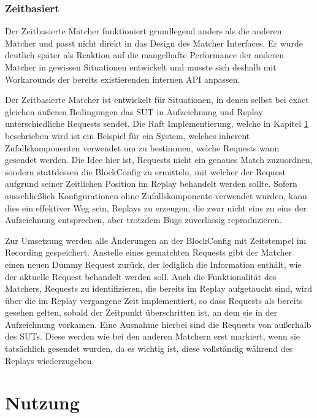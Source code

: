 \documentclass[12pt,a4paper]{report}
\begin{document}
\subsubsection{Zeitbasiert}
Der Zeitbasierte Matcher funktioniert grundlegend anders als die anderen Matcher und passt nicht direkt in das Design des Matcher
Interfaces. Er wurde deutlich später als Reaktion auf die mangelhafte Performance der anderen Matcher in gewissen Situationen
entwickelt und musste sich deshalb mit Workarounds der bereits existierenden internen API anpassen.

Der Zeitbasierte Matcher ist entwickelt für Situationen, in denen selbst bei exact gleichen äußeren Bedingungen das SUT in
Aufzeichnung und Replay unterschiedliche Requests sendet. Die Raft Implementierung, welche in Kapitel \ref{} beschrieben wird ist ein
Beispiel für ein System, welches inherent Zufallskomponenten verwendet um zu bestimmen, welche Requests wann gesendet werden.
Die Idee hier ist, Requests nicht ein genaues Match zuzuordnen, sondern stattdessen die BlockConfig zu ermitteln, mit welcher der
Request aufgrund seiner Zeitlichen Position im Replay behandelt werden sollte. Sofern ausschließlich Konfigurationen ohne
Zufallskomponente verwendet wurden, kann dies ein effektiver Weg sein, Replays zu erzeugen, die zwar nicht eins zu eins der
Aufzeichnung entsprechen, aber trotzdem Bugs zuverlässig reproduzieren.

Zur Umsetzung werden alle Änderungen an der BlockConfig mit Zeitstempel im Recording gespeichert. Anstelle eines gematchten
Requests gibt der Matcher einen neuen Dummy Request zurück, der lediglich die Information enthält, wie der aktuelle Request
behandelt werden soll. Auch die Funktionalität des Matchers, Requests zu identifizieren, die bereits im Replay aufgetaucht sind,
wird über die im Replay vergangene Zeit implementiert, so dass Requests als bereits gesehen gelten, sobald der Zeitpunkt
überschritten ist, an dem sie in der Aufzeichnung vorkamen. Eine Ausnahme hierbei sind die Requests von außerhalb des SUTs. Diese
werden wie bei den anderen Matchern erst markiert, wenn sie tatsächlich gesendet wurden, da es wichtig ist, diese vollständig
während des Replays wiederzugeben.

\section{Nutzung}
\end{document}
